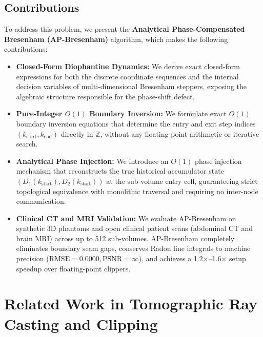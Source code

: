 \documentclass[conference]{IEEEtran}
\begin{document}
\subsection{Contributions}
To address this problem, we present the \textbf{Analytical Phase-Compensated Bresenham (AP-Bresenham)} algorithm, which makes the following contributions:
\begin{itemize}
    \item \textbf{Closed-Form Diophantine Dynamics:} We derive exact closed-form expressions for both the discrete coordinate sequences and the internal decision variables of multi-dimensional Bresenham steppers, exposing the algebraic structure responsible for the phase-shift defect.
    \item \textbf{Pure-Integer $O(1)$ Boundary Inversion:} We formulate exact $O(1)$ boundary inversion equations that determine the entry and exit step indices $(k_{\mathrm{start}}, k_{\mathrm{end}})$ directly in $\mathbb{Z}$, without any floating-point arithmetic or iterative search.
    \item \textbf{Analytical Phase Injection:} We introduce an $O(1)$ phase injection mechanism that reconstructs the true historical accumulator state $(D_1(k_{\mathrm{start}}), D_2(k_{\mathrm{start}}))$ at the sub-volume entry cell, guaranteeing strict topological equivalence with monolithic traversal and requiring no inter-node communication.
    \item \textbf{Clinical CT and MRI Validation:} We evaluate AP-Bresenham on synthetic 3D phantoms and open clinical patient scans (abdominal CT and brain MRI) across up to 512 sub-volumes. AP-Bresenham completely eliminates boundary seam gaps, conserves Radon line integrals to machine precision ($\mathrm{RMSE} = 0.0000, \mathrm{PSNR} = \infty$), and achieves a 1.2$\times$--1.6$\times$ setup speedup over floating-point clippers.
\end{itemize}

\section{Related Work in Tomographic Ray Casting and Clipping}
\label{sec:related}
\end{document}
